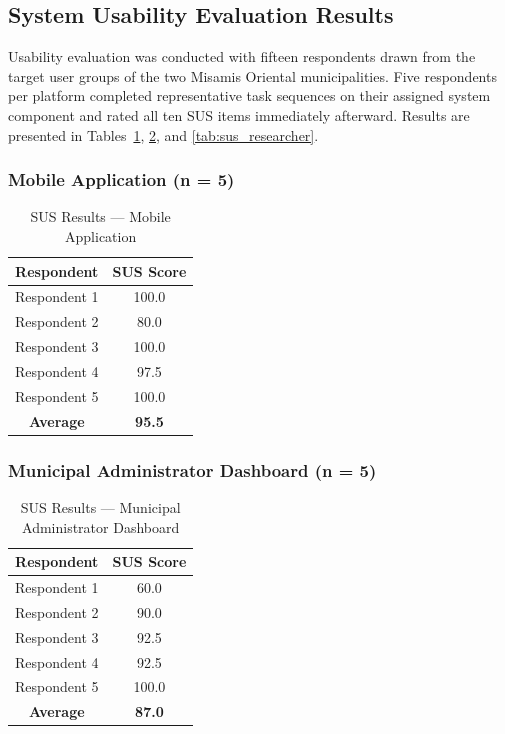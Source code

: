 \documentclass[journal]{IEEEtran}
\begin{document}
\subsection{System Usability Evaluation Results}

Usability evaluation was conducted with fifteen respondents drawn from the target user
groups of the two Misamis Oriental municipalities. Five respondents per platform completed
representative task sequences on their assigned system component and rated all ten SUS
items immediately afterward. Results are
presented in Tables~\ref{tab:sus_mobile}, \ref{tab:sus_municipal}, and
\ref{tab:sus_researcher}.

\subsubsection{Mobile Application (n = 5)}

\begin{table}[h]
\centering
\caption{SUS Results --- Mobile Application}
\label{tab:sus_mobile}
\begin{tabular}{@{}cc@{}}
\toprule
\textbf{Respondent} & \textbf{SUS Score} \\
\midrule
Respondent 1 & 100.0 \\
Respondent 2 & 80.0 \\
Respondent 3 & 100.0 \\
Respondent 4 & 97.5 \\
Respondent 5 & 100.0 \\
\midrule
\textbf{Average} & \textbf{95.5} \\
\bottomrule
\end{tabular}
\end{table}

\subsubsection{Municipal Administrator Dashboard (n = 5)}

\begin{table}[h]
\centering
\caption{SUS Results --- Municipal Administrator Dashboard}
\label{tab:sus_municipal}
\begin{tabular}{@{}cc@{}}
\toprule
\textbf{Respondent} & \textbf{SUS Score} \\
\midrule
Respondent 1 & 60.0 \\
Respondent 2 & 90.0 \\
Respondent 3 & 92.5 \\
Respondent 4 & 92.5 \\
Respondent 5 & 100.0 \\
\midrule
\textbf{Average} & \textbf{87.0} \\
\bottomrule
\end{tabular}
\end{table}
\end{document}
